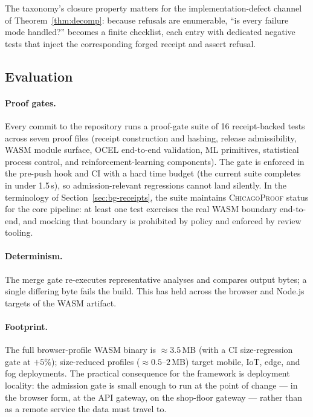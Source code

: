 The taxonomy's closure property matters for the implementation-defect channel
of Theorem~\ref{thm:decomp}: because refusals are enumerable, ``is every
failure mode handled?'' becomes a finite checklist, each entry with dedicated
negative tests that inject the corresponding forged receipt and assert
refusal.

\subsection{Evaluation}
\label{sec:impl-eval}

\paragraph{Proof gates.} Every commit to the repository runs a proof-gate
suite of 16 receipt-backed tests across seven proof files (receipt
construction and hashing, release admissibility, WASM module surface, OCEL
end-to-end validation, ML primitives, statistical process control, and
reinforcement-learning components). The gate is enforced in the pre-push hook
and CI with a hard time budget (the current suite completes in under 1.5\,s),
so admission-relevant regressions cannot land silently. In the terminology of
Section~\ref{sec:bg-receipts}, the suite maintains \textsc{ChicagoProof}
status for the core pipeline: at least one test exercises the real WASM
boundary end-to-end, and mocking that boundary is prohibited by policy and
enforced by review tooling.

\paragraph{Determinism.} The merge gate re-executes representative analyses
and compares output bytes; a single differing byte fails the build. This has
held across the browser and Node.js targets of the WASM artifact.

\paragraph{Footprint.} The full browser-profile WASM binary is
$\approx 3.5$\,MB (with a CI size-regression gate at $+5\%$); size-reduced
profiles ($\approx 0.5$--$2$\,MB) target mobile, IoT, edge, and fog
deployments. The practical consequence for the framework is deployment
locality: the admission gate is small enough to run at the point of change ---
in the browser form, at the API gateway, on the shop-floor gateway --- rather
than as a remote service the data must travel to.

